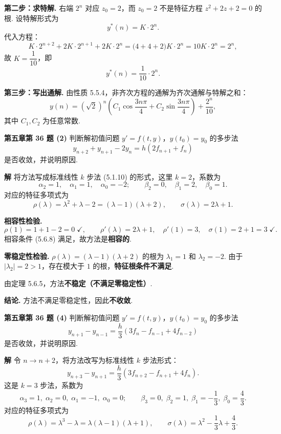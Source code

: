 \documentclass[UTF8,a4paper,11pt]{ctexart}
\begin{document}
\textbf{第二步：求特解.}\quad
右端 $2^n$ 对应 $z_0=2$，而 $z_0=2$ 不是特征方程 $z^2+2z+2=0$ 的根. 设特解形式为
\[
  y^*(n)=K\cdot 2^n.
\]
代入方程：
\[
  K\cdot 2^{n+2}+2K\cdot 2^{n+1}+2K\cdot 2^n
  =\bigl(4+4+2\bigr)K\cdot 2^n
  =10K\cdot 2^n=2^n,
\]
故 $K=\dfrac{1}{10}$，即
\[
  y^*(n)=\frac{1}{10}\cdot 2^n.
\]

\textbf{第三步：写出通解.}\quad
由性质 5.5.4，非齐次方程的通解为齐次通解与特解之和：
\[
  \boxed{
  y(n)=(\sqrt{2})^n\!\left(C_1\cos\frac{3n\pi}{4}+C_2\sin\frac{3n\pi}{4}\right)+\frac{2^n}{10},
  }
\]
其中 $C_1,C_2$ 为任意常数.

\bigskip\bigskip

\noindent\textbf{第五章\quad 第 36 题 (2)}\quad
判断解初值问题 $y'=f(t,y)$，$y(t_0)=y_0$ 的多步法
\[
  y_{n+2}+y_{n+1}-2y_n=h(2f_{n+1}+f_n)
\]
是否收敛，并说明原因.

\medskip
\noindent\textbf{解}\quad
将方法写成标准线性 $k$ 步法 (5.1.10) 的形式，这里 $k=2$，系数为
\[
  \alpha_2=1,\quad\alpha_1=1,\quad\alpha_0=-2;\qquad
  \beta_2=0,\quad\beta_1=2,\quad\beta_0=1.
\]
对应的特征多项式为
\[
  \rho(\lambda)=\lambda^2+\lambda-2=(\lambda-1)(\lambda+2),\qquad
  \sigma(\lambda)=2\lambda+1.
\]

\textbf{相容性检验.}\quad
\[
  \rho(1)=1+1-2=0\;\checkmark,\qquad
  \rho'(\lambda)=2\lambda+1,\quad\rho'(1)=3,\quad\sigma(1)=2+1=3\;\checkmark.
\]
相容条件 (5.6.8) 满足，故方法是\textbf{相容的}.

\textbf{零稳定性检验.}\quad
$\rho(\lambda)=(\lambda-1)(\lambda+2)$ 的根为 $\lambda_1=1$ 和 $\lambda_2=-2$.
由于 $|\lambda_2|=2>1$，存在模大于 $1$ 的根，\textbf{特征根条件不满足}.

由定理 5.6.5，方法\textbf{不稳定（不满足零稳定性）}.

\textbf{结论.}\quad
方法不满足零稳定性，因此\textbf{不收敛}.

\bigskip\bigskip

\noindent\textbf{第五章\quad 第 36 题 (4)}\quad
判断解初值问题 $y'=f(t,y)$，$y(t_0)=y_0$ 的多步法
\[
  y_{n+1}-y_{n-1}=\frac{h}{3}(3f_n-f_{n-1}+4f_{n-2})
\]
是否收敛，并说明原因.

\medskip
\noindent\textbf{解}\quad
令 $n\to n+2$，将方法改写为标准线性 $k$ 步法形式：
\[
  y_{n+3}-y_{n+1}=\frac{h}{3}(3f_{n+2}-f_{n+1}+4f_n).
\]
这是 $k=3$ 步法，系数为
\[
  \alpha_3=1,\;\alpha_2=0,\;\alpha_1=-1,\;\alpha_0=0;\qquad
  \beta_3=0,\;\beta_2=1,\;\beta_1=-\frac{1}{3},\;\beta_0=\frac{4}{3}.
\]
对应的特征多项式为
\[
  \rho(\lambda)=\lambda^3-\lambda=\lambda(\lambda-1)(\lambda+1),\qquad
  \sigma(\lambda)=\lambda^2-\frac{1}{3}\lambda+\frac{4}{3}.
\]
\end{document}
